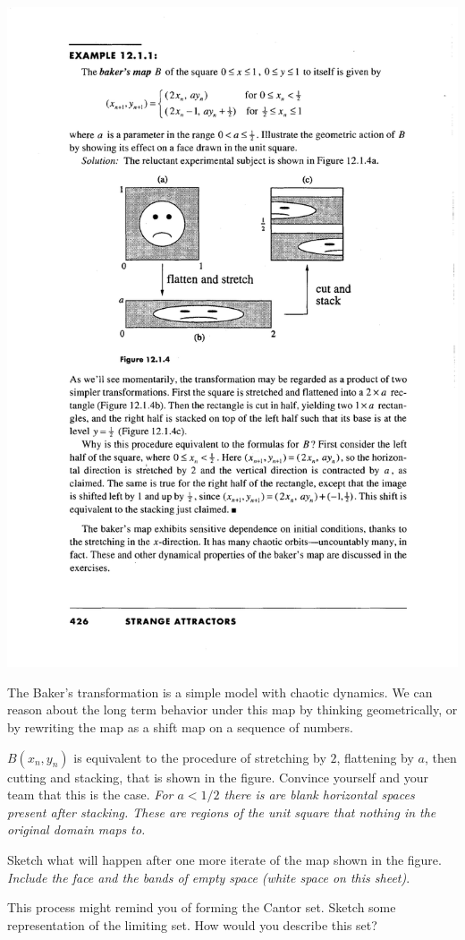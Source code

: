\documentclass[12pt,letterpaper,noanswers]{exam}
\begin{document}
\begin{questions}
\includegraphics[scale=1]{img/C25baker.pdf}

The Baker's transformation is a simple model with chaotic dynamics.  We can reason about the long term behavior under this map by thinking geometrically, or by rewriting the map as a shift map on a sequence of numbers.

\begin{parts}
\item $B(x_n, y_n)$ is equivalent to the procedure of stretching by $2$, flattening by $a$, then cutting and stacking, that is shown in the figure.  Convince yourself and your team that this is the case.  \emph{For $a<1/2$ there is are blank horizontal spaces present after stacking.  These are regions of the unit square that nothing in the original domain maps to.}
\item Sketch what will happen after one more iterate of the map shown in the figure.  \emph{Include the face and the bands of empty space (white space on this sheet)}.
\item This process might remind you of forming the Cantor set.  Sketch some representation of the limiting set.  How would you describe this set?   


\end{parts}
\end{questions}
\end{document}
